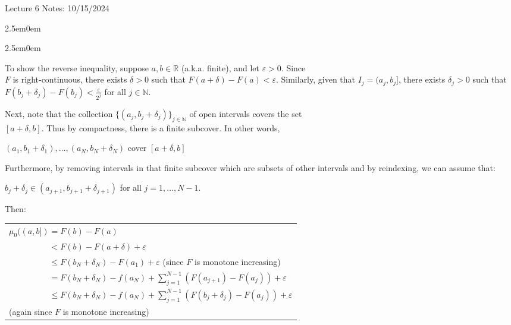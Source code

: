\documentclass{book}
\newcommand{\hTwo}{%
\color{MidnightBlue}%
   \fontsize{13}{15}\selectfont%
}
\newcommand{\hFour}{%
   \color{Cyan!80!black}
   \fontsize{12}{14}\selectfont%
}
\newcommand{\teachComment}{
   \color{Orange}%
   \fontsize{12}{14}\selectfont%
}
\newenvironment{myIndent}{%
   \begin{adjustwidth}{2.5em}{0em}%
}{%
   \end{adjustwidth}%
}
\newcommand{\retTwo}{\hfill\bigbreak}
\newcommand{\mHeader}[1]{{
   \color{Black}%
   \fontsize{20}{18}\selectfont%
   #1\retTwo
}}
\begin{document}
\mHeader{Lecture 6 Notes: 10/15/2024}

\begin{myIndent}\hTwo
   \begin{myIndent}\hFour
      To show the reverse inequality, suppose $a, b \in \mathbb{R}$ (a.k.a. finite), and let $\varepsilon > 0$. Since\\ $F$ is right-continuous, there exists $\delta > 0$ such that $F(a + \delta) - F(a) < \varepsilon$. Similarly, given that $I_j = (a_j, b_j]$, there exists $\delta_j > 0$ such that $F(b_j + \delta_j) - F(b_j) < \frac{\varepsilon}{2^j}$ for all $j \in \mathbb{N}$.\retTwo

      Next, note that the collection $\{ (a_j, b_j + \delta_j) \}_{j \in \mathbb{N}}$ of open intervals covers the set\\ $[a + \delta, b]$. Thus by compactness, there is a finite subcover. In other words,
      
      {\centering $(a_1, b_1 + \delta_1),\ldots,(a_N, b_N + \delta_N)$ cover $[a + \delta, b]$ \retTwo\par}
      
      Furthermore, by removing intervals in that finite subcover which are subsets of other intervals and by reindexing, we can assume that:

      {\centering $b_j + \delta_j \in (a_{j+1}, b_{j+1} + \delta_{j+1})$ for all $j = 1, \ldots, N - 1$. \retTwo\par}

      Then:

      {\centering 
      \begin{tabular}{l}
         $\mu_0((a, b]) = F(b) - F(a)$\\
         $\phantom{\mu_0((a, b])} < F(b) - F(a + \delta) + \varepsilon$\\
         $\phantom{\mu_0((a, b])} \leq F(b_N + \delta_N) - F(a_1) + \varepsilon$\phantom{aaaaaaa} {\teachComment(since $F$ is monotone increasing)}\\ [6pt]

         $\phantom{\mu_0((a, b])} = F(b_N + \delta_N) - f(a_N) + \sum\limits_{j=1}^{N-1}(F(a_{j+1}) - F(a_j)) + \varepsilon$\\ [14pt]

         $\phantom{\mu_0((a, b])} \leq F(b_N + \delta_N) - f(a_N) + \sum\limits_{j=1}^{N-1}(F(b_j + \delta_j) - F(a_j)) + \varepsilon$\\ [-6pt]
         \phantom{aaaaaaaaaaaaaaaaaaaaaaaaaaaaaaaaaaa} {\teachComment(again since $F$ is monotone increasing)}\\ [0pt]


\end{tabular}}
\end{myIndent}
\end{myIndent}
\end{document}
